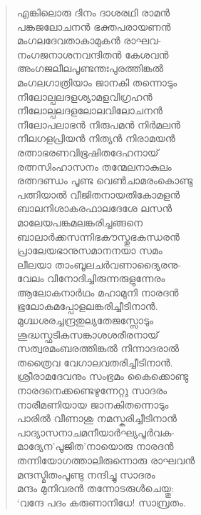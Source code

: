 \begin{verse}
എങ്കിലൊരു ദിനം ദാശരഥി രാമന്‍\\
പങ്കജലോചനന്‍ ഭക്തപരായണന്‍\\
മംഗലദേവതാകാമുകന്‍ രാഘവ-\\
നംഗജനാശനവന്ദിതന്‍ കേശവന്‍\\
അംഗജലീലപൂണ്ടന്തഃപുരത്തിങ്കല്‍\\
മംഗലഗാത്രിയാം ജാനകി തന്നൊടും\\
നീലോല്പലദളശ്യാമളവിഗ്രഹന്‍\\
നീലോല്പലദളലോലവിലോചനന്‍\\
നീലോപലാഭന്‍ നിരുപമന്‍ നിര്‍മലന്‍\\
നീലഗളപ്രിയന്‍ നിത്യന്‍ നിരാമയന്‍\\
രത്നാഭരണവിഭൂഷിതദേഹനായ്\\
രത്നസിംഹാസനം തന്മേലനാകുലം\\
രത്നദണ്ഡം പൂണ്ട വെണ്‍ചാമരംകൊണ്ടു\\
പത്നിയാല്‍ വീജിതനായതികോമളന്‍\\
ബാലനിശാകരഫാലദേശേ ലസന്‍\\
മാലേയപങ്കമലങ്കരിച്ചങ്ങനെ\\
ബാലാര്‍ക്കസന്നിഭകൗസ്തുഭകന്ധരന്‍\\
പ്രാലേയഭാനുസമാനനയാ സമം\\
ലീലയാ താംബൂലചര്‍വണാദ്യൈരനു-\\
വേലം വിനോദിച്ചിരുന്നരുളുന്നേരം\\
ആലോകനാര്‍ഥം മഹാമുനി നാരദന്‍\\
ഭൂലോകമപ്പോളലങ്കരിച്ചീടിനാന്‍.\\
മുഗ്ദ്ധശരച്ചന്ദ്രതുല്യതേജസ്സോടും\\
ശുദ്ധസ്ഫടികസങ്കാശശരീരനായ്\\
സത്വരമംബരത്തിങ്കല്‍ നിന്നാദരാല്‍\\
തത്രൈവ വേഗാലവതരിച്ചീടിനാന്‍.\\
ശ്രീരാമദേവനും സംഭ്രമം കൈക്കൊണ്ടു\\
നാരദനെക്കണ്ടെഴുന്നേറ്റു സാദരം\\
നാരീമണിയായ ജാനകിതന്നൊടും\\
പാരില്‍ വീണാശു നമസ്കരിച്ചീടിനാന്‍\\
പാദ്യാസനാചമനീയാര്‍ഘ്യപൂര്‍വക-\\
മാദ്യേന’പൂജിത’നായൊരു നാരദന്‍\\
തന്നിയോഗത്താലിരുന്നൊരു രാഘവന്‍\\
മന്ദസ്മിതംപൂണ്ടു നന്ദിച്ചു സാദരം\\
മന്ദം മുനിവരന്‍ തന്നോടരുള്‍ചെയ്തു:\\
‘വന്ദേ പദം കരുണാനിധേ! സാമ്പ്രതം.\\

\end{verse}
